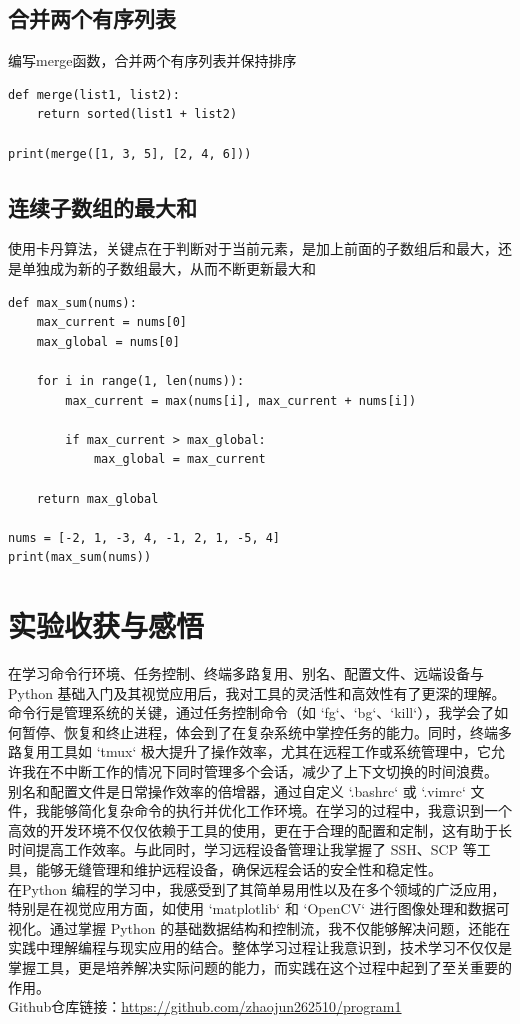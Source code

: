 \documentclass[UTF8,a4paper]{ctexart}
\begin{document}
\begin{sloppypar}
\subsection{合并两个有序列表}
	编写merge函数，合并两个有序列表并保持排序
\begin{lstlisting}
def merge(list1, list2):
    return sorted(list1 + list2)

print(merge([1, 3, 5], [2, 4, 6]))  
\end{lstlisting}

\subsection{连续子数组的最大和}
	使用卡丹算法，关键点在于判断对于当前元素，是加上前面的子数组后和最大，还是单独成为新的子数组最大，从而不断更新最大和
\begin{lstlisting}
def max_sum(nums):
    max_current = nums[0] 
    max_global = nums[0] 

    for i in range(1, len(nums)):
        max_current = max(nums[i], max_current + nums[i])

        if max_current > max_global:
            max_global = max_current

    return max_global

nums = [-2, 1, -3, 4, -1, 2, 1, -5, 4]
print(max_sum(nums))
\end{lstlisting}
	
	
	


	\section{实验收获与感悟}
	在学习命令行环境、任务控制、终端多路复用、别名、配置文件、远端设备与 Python 基础入门及其视觉应用后，我对工具的灵活性和高效性有了更深的理解。命令行是管理系统的关键，通过任务控制命令（如 `fg`、`bg`、`kill`），我学会了如何暂停、恢复和终止进程，体会到了在复杂系统中掌控任务的能力。同时，终端多路复用工具如 `tmux` 极大提升了操作效率，尤其在远程工作或系统管理中，它允许我在不中断工作的情况下同时管理多个会话，减少了上下文切换的时间浪费。\\
	\indent 别名和配置文件是日常操作效率的倍增器，通过自定义 `.bashrc` 或 `.vimrc` 文件，我能够简化复杂命令的执行并优化工作环境。在学习的过程中，我意识到一个高效的开发环境不仅仅依赖于工具的使用，更在于合理的配置和定制，这有助于长时间提高工作效率。与此同时，学习远程设备管理让我掌握了 SSH、SCP 等工具，能够无缝管理和维护远程设备，确保远程会话的安全性和稳定性。\\
	\indent 在Python 编程的学习中，我感受到了其简单易用性以及在多个领域的广泛应用，特别是在视觉应用方面，如使用 `matplotlib` 和 `OpenCV` 进行图像处理和数据可视化。通过掌握 Python 的基础数据结构和控制流，我不仅能够解决问题，还能在实践中理解编程与现实应用的结合。整体学习过程让我意识到，技术学习不仅仅是掌握工具，更是培养解决实际问题的能力，而实践在这个过程中起到了至关重要的作用。\\
	
	Github仓库链接：\url{https://github.com/zhaojun262510/program1}
	
\end{sloppypar}
\end{document}
